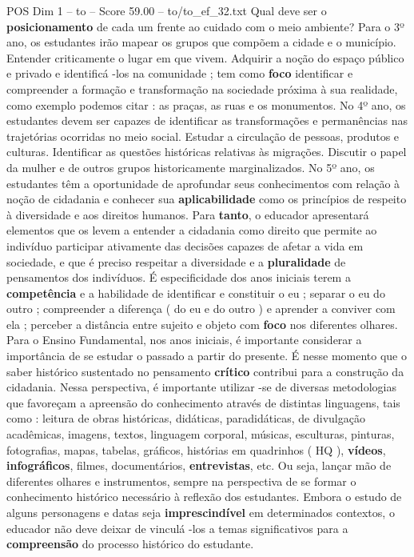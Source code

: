 \begin{textsample}{POS Dim 1 – to – Score 59.00 – to/to\_ef\_32.txt}
Qual deve ser o \textbf{posicionamento} de cada um frente ao cuidado com o meio ambiente?
Para o 3º ano, os estudantes irão mapear os grupos que compõem a cidade e o município.
Entender criticamente o lugar em que vivem.
Adquirir a noção do espaço público e privado e identificá -los na comunidade ; tem como \textbf{foco} identificar e compreender a formação e transformação na sociedade próxima à sua realidade, como exemplo podemos citar : as praças, as ruas e os monumentos.
No 4º ano, os estudantes devem ser capazes de identificar as transformações e permanências nas trajetórias ocorridas no meio social.
Estudar a circulação de pessoas, produtos e culturas.
Identificar as questões históricas relativas às migrações.
Discutir o papel da mulher e de outros grupos historicamente marginalizados.
No 5º ano, os estudantes têm a oportunidade de aprofundar seus conhecimentos com relação à noção de cidadania e conhecer sua \textbf{aplicabilidade} como os princípios de respeito à diversidade e aos direitos humanos.
Para \textbf{tanto}, o educador apresentará elementos que os levem a entender a cidadania como direito que permite ao indivíduo participar ativamente das decisões capazes de afetar a vida em sociedade, e que é preciso respeitar a diversidade e a \textbf{pluralidade} de pensamentos dos indivíduos.
É especificidade dos anos iniciais terem a \textbf{competência} e a habilidade de identificar e constituir o eu ; separar o eu do outro ; compreender a diferença ( do eu e do outro ) e aprender a conviver com ela ; perceber a distância entre sujeito e objeto com \textbf{foco} nos diferentes olhares.
Para o Ensino Fundamental, nos anos iniciais, é importante considerar a importância de se estudar o passado a partir do presente.
É nesse momento que o saber histórico sustentado no pensamento \textbf{crítico} contribui para a construção da cidadania.
Nessa perspectiva, é importante utilizar -se de diversas metodologias que favoreçam a apreensão do conhecimento através de distintas linguagens, tais como : leitura de obras históricas, didáticas, paradidáticas, de divulgação acadêmicas, imagens, textos, linguagem corporal, músicas, esculturas, pinturas, fotografias, mapas, tabelas, gráficos, histórias em quadrinhos ( HQ ), \textbf{vídeos}, \textbf{infográficos}, filmes, documentários, \textbf{entrevistas}, etc.
Ou seja, lançar mão de diferentes olhares e instrumentos, sempre na perspectiva de se formar o conhecimento histórico necessário à reflexão dos estudantes.
Embora o estudo de alguns personagens e datas seja \textbf{imprescindível} em determinados contextos, o educador não deve deixar de vinculá -los a temas significativos para a \textbf{compreensão} do processo histórico do estudante.

\end{textsample}
